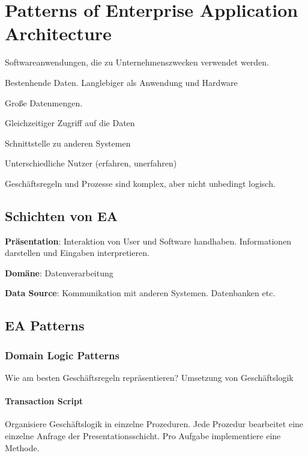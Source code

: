 \chapter{Patterns of Enterprise Application Architecture}

Softwareanwendungen, die zu Unternehmenszwecken verwendet werden.

\begin{compactitem}
    \item Bestenhende Daten. Langlebiger als Anwendung und Hardware
    \item Große Datenmengen.
    \item Gleichzeitiger Zugriff auf die Daten
    \item Schnittstelle zu anderen Systemen
    \item Unterschiedliche Nutzer (erfahren, unerfahren)
    \item Geschäftsregeln und Prozesse sind komplex, aber nicht unbedingt logisch.
\end{compactitem}

\section{Schichten von EA}
\begin{compactitem}
    \item \textbf{Präsentation}: Interaktion von User und Software handhaben. Informationen darstellen und
    Eingaben interpretieren.
    \item \textbf{Domäne}: Datenverarbeitung
    \item \textbf{Data Source}: Kommunikation mit anderen Systemen. Datenbanken etc.
\end{compactitem}

\section{EA Patterns}

\subsection{Domain Logic Patterns}
Wie am besten Geschäftsregeln repräsentieren?
Umsetzung von Geschäftslogik
\subsubsection{Transaction Script}
Organisiere Geschäftslogik in einzelne Prozeduren. Jede Prozedur bearbeitet eine einzelne
Anfrage der Presentationsschicht.
Pro Aufgabe implementiere eine Methode.

